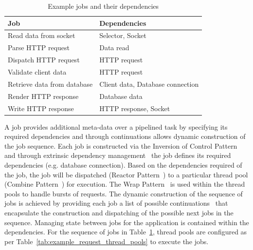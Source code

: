 \documentclass[conference]{ieee/IEEEtran}
\begin{document}
\begin{table}[!t]
\renewcommand{\arraystretch}{1.3}
\caption{Example jobs and their dependencies}
\label{tab:example_request_jobs}
\centering
\begin{tabular}{l||l}
\hline
\bfseries Job & \bfseries Dependencies \\
\hline\hline
Read data from socket & Selector, Socket \\
\hline
Parse HTTP request & Data read \\
\hline
Dispatch HTTP request & HTTP request \\
\hline
Validate client data & HTTP request \\
\hline
Retrieve data from database & Client data, Database connection \\
\hline
Render HTTP response & Database data \\
\hline
Write HTTP response & HTTP response, Socket \\
\hline
\end{tabular}
\end{table}

A job provides additional meta-data over a pipelined task by specifying its
required dependencies and through continuations allows dynamic construction of
the job sequence.  Each job is constructed via the Inversion of Control Pattern
and through extrinsic dependency management~\cite{ioc} the job defines its
required dependencies (e.g. database connection).  Based on the dependencies
required of the job, the job will be dispatched (Reactor Pattern~\cite{reactor})
to a particular thread pool (Combine Pattern~\cite{pipeline}) for execution.
The Wrap Pattern~\cite{pipeline} is used within the thread pools to handle
bursts of requests.  The dynamic construction of the sequence of jobs is
achieved by providing each job a list of possible
continuations~\cite{continuations} that encapsulate the construction and
dispatching of the possible next jobs in the sequence. Managing state between
jobs for the application is contained within the dependencies.  For the sequence
of jobs in Table~\ref{tab:example_request_jobs}, thread pools are configured as
per Table~\ref{tab:example_request_thread_pools} to execute the jobs.
\end{document}
